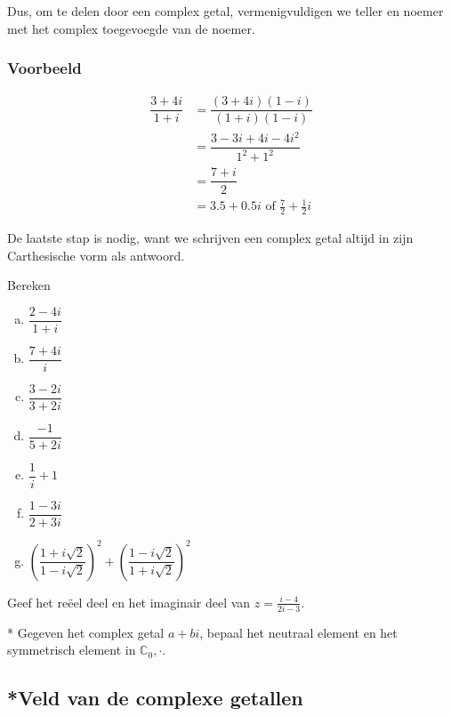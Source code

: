 \documentclass[12pt,twoside,a4paper]{article}
\begin{document}
Dus, om te delen door een complex getal, vermenigvuldigen we teller en noemer met het complex toegevoegde van de noemer.

\subsubsection*{Voorbeeld}
\begin{align*}
  \dfrac{3+4i}{1+i} &= \dfrac{(3+4i)(1-i)}{(1+i)(1-i)} \\
                    &= \dfrac{3-3i + 4i - 4i^2}{1^2 + 1^2}\\
                    &= \dfrac{7 + i}{2}\\
                    &= 3.5 + 0.5i \mbox{ of } \frac{7}{2} + \frac{1}{2}i
\end{align*}

De laatste stap is nodig, want we schrijven een complex getal altijd in zijn Carthesische vorm als antwoord.

\begin{oefening}
  Bereken
  \begin{multicols}{2}
  \begin{enumerate}[(a)]
  \itemsep1em
  \item $\displaystyle \dfrac{2-4i}{1+i}$
  \item $\displaystyle \dfrac{7+4i}{i}$
  \item $\displaystyle \dfrac{3-2i}{3+2i}$
  \item $\displaystyle \dfrac{-1}{5+2i}$
  \item $\displaystyle \dfrac{1}{i}+1$
  \item $\displaystyle \dfrac{1-3i}{2+3i}$
  \item $\displaystyle \left(\dfrac{1+i\sqrt{2}}{1-i\sqrt{2}}\right)^2+\left(\dfrac{1-i\sqrt{2}}{1+i\sqrt{2}}\right)^2$
  \end{enumerate}
  \end{multicols}
\end{oefening}

\begin{oefening}
  Geef het reëel deel en het imaginair deel van $z=\frac{i-4}{2i-3}$.
\end{oefening}

\begin{oefening}*
  Gegeven het complex getal $a+bi$, bepaal het neutraal element en het symmetrisch element in $\mathbb{C}_0, \cdot$.
\end{oefening}

\subsection{*Veld van de complexe getallen}
\end{document}
